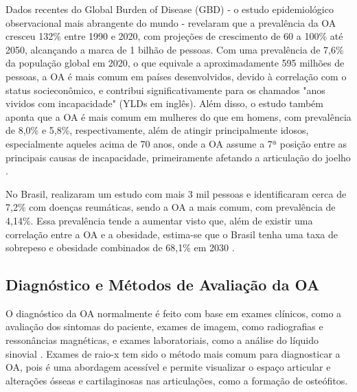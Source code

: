 Dados recentes do Global Burden of Disease (GBD) - o estudo epidemiológico observacional mais abrangente do mundo - revelaram que a prevalência da OA cresceu 132\% entre 1990 e 2020, com projeções de crescimento de 60 a 100\% até 2050, alcançando a marca de 1 bilhão de pessoas. Com uma prevalência de 7,6\% da população global em 2020, o que equivale a aproximadamente 595 milhões de pessoas, a OA é mais comum em países desenvolvidos, devido à correlação com o status socieconômico, e contribui significativamente para os chamados "anos vividos com incapacidade" (YLDs em inglês). Além disso, o estudo também aponta que a OA é mais comum em mulheres do que em homens, com prevalência de 8,0\% e 5,8\%, respectivamente, além de atingir principalmente idosos, especialmente aqueles acima de 70 anos, onde a OA assume a 7ª posição entre as principais causas de incapacidade, primeiramente afetando a articulação do joelho \citep{COURTIES20241397}.

No Brasil, \cite{RodriguesSenna2004} realizaram um estudo com mais 3 mil pessoas e identificaram cerca de 7,2\% com doenças reumáticas, sendo a OA a mais comum, com prevalência de 4,14\%. Essa prevalência tende a aumentar visto que, além de existir uma correlação entre a OA e a obesidade, estima-se que o Brasil tenha uma taxa de sobrepeso e obesidade combinados de 68,1\% em 2030 \citep{fiocruz2024}.


\subsection{Diagnóstico e Métodos de Avaliação da OA}

O diagnóstico da OA normalmente é feito com base em exames clínicos, como a avaliação dos sintomas do paciente, exames de imagem, como radiografias e ressonâncias magnéticas, e exames laboratoriais, como a análise do líquido sinovial \citep{Kraus2015}. Exames de raio-x tem sido o método mais comum para diagnosticar a OA, pois é uma abordagem acessível e permite visualizar o espaço articular e alterações ósseas e cartilaginosas nas articulações, como a formação de osteófitos.

